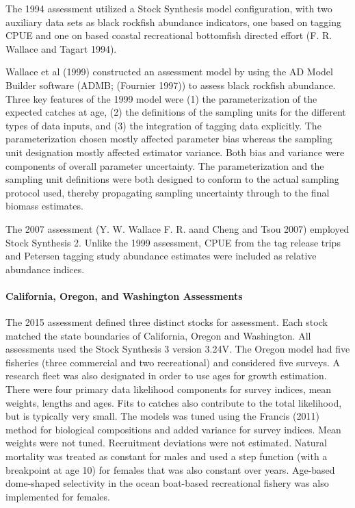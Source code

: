 \documentclass[11pt,
  english,
  letterpaper,
]{article}
\begin{document}
The 1994 assessment utilized a Stock Synthesis model configuration, with two auxiliary data sets as black rockfish abundance indicators, one based on tagging CPUE and one on based coastal recreational bottomfish directed effort (F. R. Wallace and Tagart 1994).

Wallace et al (1999) constructed an assessment model by using the AD Model Builder software (ADMB; (Fournier 1997)) to assess black rockfish abundance. Three key features of the 1999 model were (1) the parameterization of the expected catches at age, (2) the definitions of the sampling units for the different types of data inputs, and (3) the integration of tagging data explicitly. The parameterization chosen mostly affected parameter bias whereas the sampling unit designation mostly affected estimator variance. Both bias and variance were components of overall parameter uncertainty. The parameterization and the sampling unit definitions were both designed to conform to the actual sampling protocol used, thereby propagating sampling uncertainty through to the final biomass estimates.

The 2007 assessment (Y. W. Wallace F. R. aand Cheng and Tsou 2007) employed Stock Synthesis 2. Unlike the 1999 assessment, CPUE from the tag release trips and Petersen tagging study abundance estimates were included as relative abundance indices.

\hypertarget{california-oregon-and-washington-assessments}{%
\paragraph{California, Oregon, and Washington Assessments}\label{california-oregon-and-washington-assessments}}

The 2015 assessment defined three distinct stocks for assessment. Each stock matched the state boundaries of California, Oregon and Washington. All assessments used the Stock Synthesis 3 version 3.24V. The Oregon model had five fisheries (three commercial and two recreational) and considered five surveys. A research fleet was also designated in order to use ages for growth estimation. There were four primary data likelihood components for survey indices, mean weights, lengths and ages. Fits to catches also contribute to the total likelihood, but is typically very small. The models was tuned using the Francis (2011) method for biological compositions and added variance for survey indices. Mean weights were not tuned. Recruitment deviations were not estimated. Natural mortality was treated as constant for males and used a step function (with a breakpoint at age 10) for females that was also constant over years. Age-based dome-shaped selectivity in the ocean boat-based recreational fishery was also implemented for females.
\end{document}
